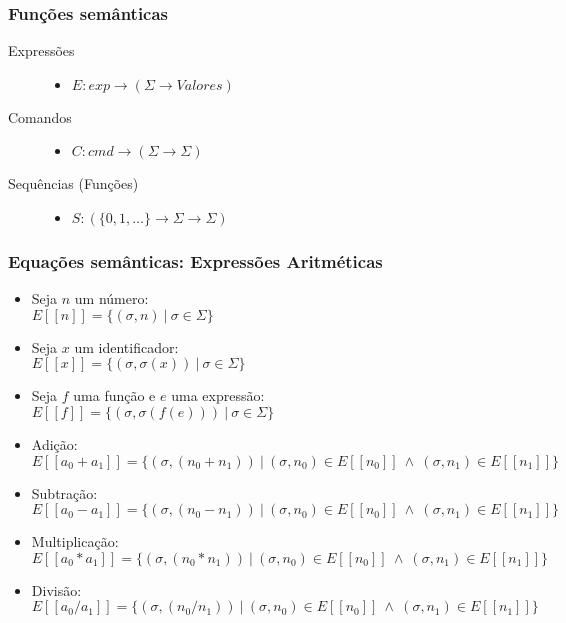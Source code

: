 \documentclass{beamer}
\begin{document}
\begin{frame}[fragile]
\frametitle{Fun\c c\~oes sem\^anticas}
\begin{description}
\item[Express\~oes]\hfill
  \begin{itemize}
  \item $E: exp \to (\Sigma \to Valores)$
  \end{itemize}
\item[Comandos]\hfill
  \begin{itemize}
  \item $C: cmd \to (\Sigma \to \Sigma)$
  \end{itemize}
\item[Sequ\^encias (Fun\c c\~oes)]\hfill
  \begin{itemize}
  \item $S : (\{0, 1, \ldots\} \to \Sigma
    \to \Sigma)$
  \end{itemize}
\end{description}
\end{frame}

\begin{frame}[fragile]
\frametitle{Equa\c c\~oes sem\^anticas: Express\~oes Aritm\'eticas}
  \begin{itemize}
  \item Seja $n$ um n\'umero:\\
    $E[[n]] = \{(\sigma, n)\ |\ \sigma \in \Sigma\}$
  \item Seja $x$ um identificador:\\
    $E[[x]] = \{(\sigma, \sigma (x))\ |\ \sigma \in \Sigma\}$
  \item Seja $f$ uma fun\c c\~ao e $e$ uma express\~ao:\\
    $E[[f]] = \{(\sigma, \sigma (f(e)))\ |\ \sigma \in \Sigma\}$
  \item Adi\c c\~ao:\\
    $E[[a_0 + a_1]] = \{(\sigma, (n_0 + n_1))\ |\ (\sigma, n_0) \in
    E[[n_0]]\ \wedge\ (\sigma, n_1) \in E[[n_1]]\}$
  \item Subtra\c c\~ao:\\
    $E[[a_0 - a_1]] = \{(\sigma, (n_0- n_1))\ |\ (\sigma, n_0) \in
    E[[n_0]]\ \wedge\ (\sigma, n_1) \in E[[n_1]]\}$
  \item Multiplica\c c\~ao:\\
    $E[[a_0 * a_1]] = \{(\sigma, (n_0 * n_1))\ |\ (\sigma, n_0) \in
    E[[n_0]]\ \wedge\ (\sigma, n_1) \in E[[n_1]]\}$
  \item Divis\~ao:\\
    $E[[a_0 / a_1]] = \{(\sigma, (n_0 / n_1))\ |\ (\sigma, n_0) \in
    E[[n_0]]\ \wedge\ (\sigma, n_1) \in E[[n_1]]\}$
  \end{itemize}
\end{frame}
\end{document}
